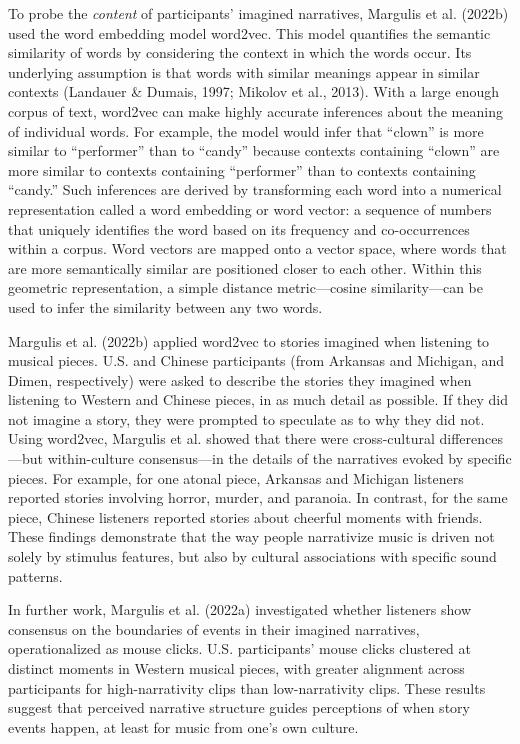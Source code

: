 \documentclass[12pt,twoside]{reedthesis}
\begin{document}
To probe the \emph{content} of participants’ imagined narratives, Margulis et al. (2022b) used the word embedding model word2vec. This model quantifies the semantic similarity of words by considering the context in which the words occur. Its underlying assumption is that words with similar meanings appear in similar contexts (Landauer \& Dumais, 1997; Mikolov et al., 2013). With a large enough corpus of text, word2vec can make highly accurate inferences about the meaning of individual words. For example, the model would infer that “clown” is more similar to “performer” than to “candy” because contexts containing “clown” are more similar to contexts containing “performer” than to contexts containing “candy.” Such inferences are derived by transforming each word into a numerical representation called a word embedding or word vector: a sequence of numbers that uniquely identifies the word based on its frequency and co-occurrences within a corpus. Word vectors are mapped onto a vector space, where words that are more semantically similar are positioned closer to each other. Within this geometric representation, a simple distance metric—cosine similarity—can be used to infer the similarity between any two words. 

Margulis et al. (2022b) applied word2vec to stories imagined when listening to musical pieces. U.S. and Chinese participants (from Arkansas and Michigan, and Dimen, respectively) were asked to describe the stories they imagined when listening to Western and Chinese pieces, in as much detail as possible. If they did not imagine a story, they were prompted to speculate as to why they did not. Using word2vec, Margulis et al. showed that there were cross-cultural differences—but within-culture consensus—in the details of the narratives evoked by specific pieces. For example, for one atonal piece, Arkansas and Michigan listeners reported stories involving horror, murder, and paranoia. In contrast, for the same piece, Chinese listeners reported stories about cheerful moments with friends. These findings demonstrate that the way people narrativize music is driven not solely by stimulus features, but also by cultural associations with specific sound patterns. 

In further work, Margulis et al. (2022a) investigated whether listeners show consensus on the boundaries of events in their imagined narratives, operationalized as mouse clicks. U.S. participants’ mouse clicks clustered at distinct moments in Western musical pieces, with greater alignment across participants for high-narrativity clips than low-narrativity clips. These results suggest that perceived narrative structure guides perceptions of when story events happen, at least for music from one’s own culture.
\end{document}
